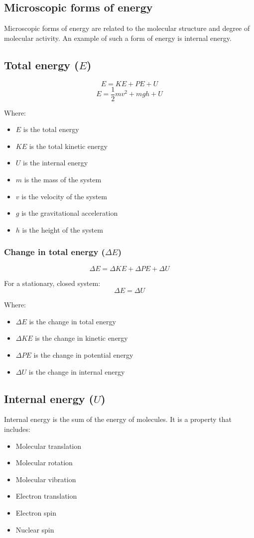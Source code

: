 \documentclass[11pt]{article}
\begin{document}
\subsection{Microscopic forms of energy}
\label{sec:org5b125ad}
Microscopic forms of energy are related to the molecular structure and degree of molecular activity. An example of such a form of energy is internal energy.

\newpage
\subsection{Total energy (\(E\))}
\label{sec:org34ac701}
\[E = KE + PE + U\]
\[E = \frac{1}{2} mv^2 + mgh + U\]

Where:
\begin{itemize}
\item \(E\) is the total energy
\item \(KE\) is the total kinetic energy
\item \(U\) is the internal energy
\item \(m\) is the mass of the system
\item \(v\) is the velocity of the system
\item \(g\) is the gravitational acceleration
\item \(h\) is the height of the system
\end{itemize}
\subsubsection{Change in total energy (\(\Delta E\))}
\label{sec:orgd6a1563}
\[\Delta E = \Delta KE + \Delta PE + \Delta U\]

For a stationary, closed system:
\[\Delta E = \Delta U\]

Where:
\begin{itemize}
\item \(\Delta E\) is the change in total energy
\item \(\Delta KE\) is the change in kinetic energy
\item \(\Delta PE\) is the change in potential energy
\item \(\Delta U\) is the change in internal energy
\end{itemize}
\subsection{Internal energy (\(U\))}
\label{sec:org424f029}
Internal energy is the sum of the energy of molecules. It is a property that includes:
\begin{itemize}
\item Molecular translation
\item Molecular rotation
\item Molecular vibration
\item Electron translation
\item Electron spin
\item Nuclear spin
\end{itemize}
\end{document}
